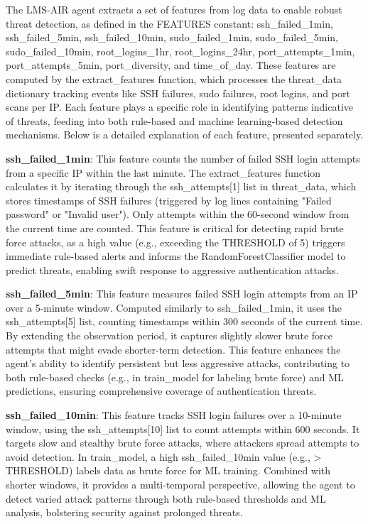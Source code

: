 The LMS-AIR agent extracts a set of features from log data to enable robust threat detection, as defined in the FEATURES constant: ssh\_failed\_1min, ssh\_failed\_5min, ssh\_failed\_10min, sudo\_failed\_1min, sudo\_failed\_5min, sudo\_failed\_10min, root\_logins\_1hr, root\_logins\_24hr, port\_attempts\_1min, port\_attempts\_5min, port\_diversity, and time\_of\_day. These features are computed by the extract\_features function, which processes the threat\_data dictionary tracking events like SSH failures, sudo failures, root logins, and port scans per IP. Each feature plays a specific role in identifying patterns indicative of threats, feeding into both rule-based and machine learning-based detection mechanisms. Below is a detailed explanation of each feature, presented separately.

\textbf{ssh\_failed\_1min}: This feature counts the number of failed SSH login attempts from a specific IP within the last minute. The extract\_features function calculates it by iterating through the ssh\_attempts[1] list in threat\_data, which stores timestamps of SSH failures (triggered by log lines containing "Failed password" or "Invalid user"). Only attempts within the 60-second window from the current time are counted. This feature is critical for detecting rapid brute force attacks, as a high value (e.g., exceeding the THRESHOLD of 5) triggers immediate rule-based alerts and informs the RandomForestClassifier model to predict threats, enabling swift response to aggressive authentication attacks.

\textbf{ssh\_failed\_5min}: This feature measures failed SSH login attempts from an IP over a 5-minute window. Computed similarly to ssh\_failed\_1min, it uses the ssh\_attempts[5] list, counting timestamps within 300 seconds of the current time. By extending the observation period, it captures slightly slower brute force attempts that might evade shorter-term detection. This feature enhances the agent’s ability to identify persistent but less aggressive attacks, contributing to both rule-based checks (e.g., in train\_model for labeling brute force) and ML predictions, ensuring comprehensive coverage of authentication threats.

\textbf{ssh\_failed\_10min}: This feature tracks SSH login failures over a 10-minute window, using the ssh\_attempts[10] list to count attempts within 600 seconds. It targets slow and stealthy brute force attacks, where attackers spread attempts to avoid detection. In train\_model, a high ssh\_failed\_10min value (e.g., > THRESHOLD) labels data as brute force for ML training. Combined with shorter windows, it provides a multi-temporal perspective, allowing the agent to detect varied attack patterns through both rule-based thresholds and ML analysis, bolstering security against prolonged threats.

